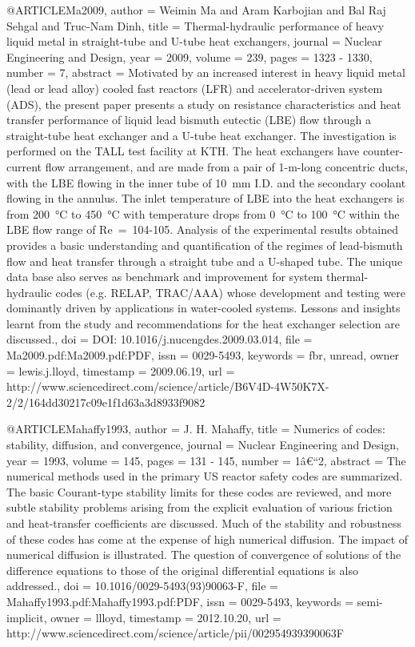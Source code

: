 {@ARTICLE{Ma2009,
  author = {Weimin Ma and Aram Karbojian and Bal Raj Sehgal and Truc-Nam Dinh},
  title = {Thermal-hydraulic performance of heavy liquid metal in straight-tube
	and U-tube heat exchangers},
  journal = {Nuclear Engineering and Design},
  year = {2009},
  volume = {239},
  pages = {1323 - 1330},
  number = {7},
  abstract = {Motivated by an increased interest in heavy liquid metal (lead or
	lead alloy) cooled fast reactors (LFR) and accelerator-driven system
	(ADS), the present paper presents a study on resistance characteristics
	and heat transfer performance of liquid lead bismuth eutectic (LBE)
	flow through a straight-tube heat exchanger and a U-tube heat exchanger.
	The investigation is performed on the TALL test facility at KTH.
	The heat exchangers have counter-current flow arrangement, and are
	made from a pair of 1-m-long concentric ducts, with the LBE flowing
	in the inner tube of 10 mm I.D. and the secondary coolant flowing
	in the annulus. The inlet temperature of LBE into the heat exchangers
	is from 200 °C to 450 °C with temperature drops from 0 °C to 100 °C
	within the LBE flow range of Re = 104-105. Analysis of the experimental
	results obtained provides a basic understanding and quantification
	of the regimes of lead-bismuth flow and heat transfer through a straight
	tube and a U-shaped tube. The unique data base also serves as benchmark
	and improvement for system thermal-hydraulic codes (e.g. RELAP, TRAC/AAA)
	whose development and testing were dominantly driven by applications
	in water-cooled systems. Lessons and insights learnt from the study
	and recommendations for the heat exchanger selection are discussed.},
  doi = {DOI: 10.1016/j.nucengdes.2009.03.014},
  file = {Ma2009.pdf:Ma2009.pdf:PDF},
  issn = {0029-5493},
  keywords = {fbr, unread},
  owner = {lewis.j.lloyd},
  timestamp = {2009.06.19},
  url = {http://www.sciencedirect.com/science/article/B6V4D-4W50K7X-2/2/164dd30217c09e1f1d63a3d8933f9082}
}

@ARTICLE{Mahaffy1993,
  author = {J. H. Mahaffy},
  title = {Numerics of codes: stability, diffusion, and convergence},
  journal = {Nuclear Engineering and Design},
  year = {1993},
  volume = {145},
  pages = {131 - 145},
  number = {1â€“2},
  abstract = {The numerical methods used in the primary US reactor safety codes
	are summarized. The basic Courant-type stability limits for these
	codes are reviewed, and more subtle stability problems arising from
	the explicit evaluation of various friction and heat-transfer coefficients
	are discussed. Much of the stability and robustness of these codes
	has come at the expense of high numerical diffusion. The impact of
	numerical diffusion is illustrated. The question of convergence of
	solutions of the difference equations to those of the original differential
	equations is also addressed.},
  doi = {10.1016/0029-5493(93)90063-F},
  file = {Mahaffy1993.pdf:Mahaffy1993.pdf:PDF},
  issn = {0029-5493},
  keywords = {semi-implicit},
  owner = {llloyd},
  timestamp = {2012.10.20},
  url = {http://www.sciencedirect.com/science/article/pii/002954939390063F}
}

}
